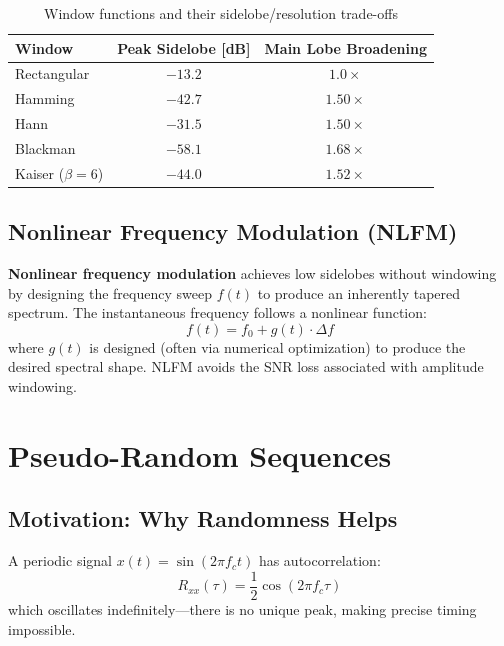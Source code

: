 \documentclass[11pt]{article}
\begin{document}
\begin{table}[h]
\centering
\begin{tabular}{lcc}
\toprule
\textbf{Window} & \textbf{Peak Sidelobe [dB]} & \textbf{Main Lobe Broadening} \\
\midrule
Rectangular & $-13.2$ & $1.0\times$ \\
Hamming & $-42.7$ & $1.50\times$ \\
Hann & $-31.5$ & $1.50\times$ \\
Blackman & $-58.1$ & $1.68\times$ \\
Kaiser ($\beta=6$) & $-44.0$ & $1.52\times$ \\
\bottomrule
\end{tabular}
\caption{Window functions and their sidelobe/resolution trade-offs}
\end{table}

\subsection{Nonlinear Frequency Modulation (NLFM)}

\textbf{Nonlinear frequency modulation} achieves low sidelobes without windowing by designing the frequency sweep $f(t)$ to produce an inherently tapered spectrum. The instantaneous frequency follows a nonlinear function:
\begin{equation}
f(t) = f_0 + g(t) \cdot \Delta f
\end{equation}
where $g(t)$ is designed (often via numerical optimization) to produce the desired spectral shape. NLFM avoids the SNR loss associated with amplitude windowing.

\section{Pseudo-Random Sequences}

\subsection{Motivation: Why Randomness Helps}

A periodic signal $x(t) = \sin(2\pi f_c t)$ has autocorrelation:
\begin{equation}
R_{xx}(\tau) = \frac{1}{2}\cos(2\pi f_c \tau)
\end{equation}
which oscillates indefinitely---there is no unique peak, making precise timing impossible.
\end{document}
